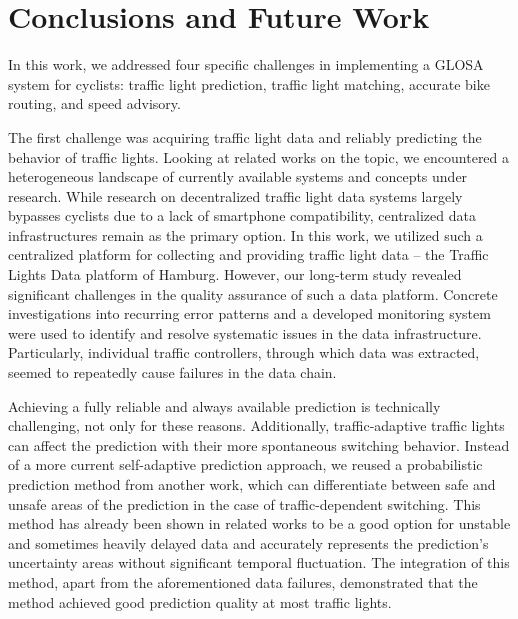 \chapter{Conclusions and Future Work}\label{ch:conclusions}

In this work, we addressed four specific challenges in implementing a GLOSA system for cyclists: traffic light prediction, traffic light matching, accurate bike routing, and speed advisory.

The first challenge was acquiring traffic light data and reliably predicting the behavior of traffic lights. Looking at related works on the topic, we encountered a heterogeneous landscape of currently available systems and concepts under research. While research on decentralized traffic light data systems largely bypasses cyclists due to a lack of smartphone compatibility, centralized data infrastructures remain as the primary option. In this work, we utilized such a centralized platform for collecting and providing traffic light data -- the Traffic Lights Data platform of Hamburg. However, our long-term study revealed significant challenges in the quality assurance of such a data platform. Concrete investigations into recurring error patterns and a developed monitoring system were used to identify and resolve systematic issues in the data infrastructure. Particularly, individual traffic controllers, through which data was extracted, seemed to repeatedly cause failures in the data chain.

Achieving a fully reliable and always available prediction is technically challenging, not only for these reasons. Additionally, traffic-adaptive traffic lights can affect the prediction with their more spontaneous switching behavior. Instead of a more current self-adaptive prediction approach, we reused a probabilistic prediction method from another work, which can differentiate between safe and unsafe areas of the prediction in the case of traffic-dependent switching. This method has already been shown in related works to be a good option for unstable and sometimes heavily delayed data and accurately represents the prediction's uncertainty areas without significant temporal fluctuation. The integration of this method, apart from the aforementioned data failures, demonstrated that the method achieved good prediction quality at most traffic lights.

